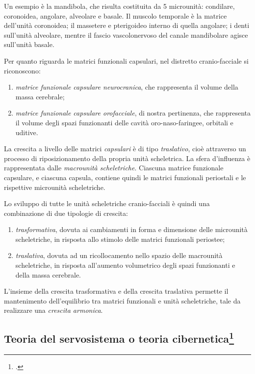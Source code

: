 Un esempio è la mandibola, che risulta costituita da 5 microunità: condilare, coronoidea, angolare, alveolare e basale. Il muscolo temporale è la matrice dell'unità coronoidea; il massetere e pterigoideo interno di quella angolare; i denti sull'unità alveolare, mentre il fascio vascolonervoso del canale mandibolare agisce sull'unità basale.

Per quanto riguarda le matrici funzionali capsulari, nel distretto cranio-facciale si riconoscono:

\begin{enumerate}
\item \textit{matrice funzionale capsulare neurocranica}, che rappresenta il volume della massa cerebrale;
\item \textit{matrice funzionale capsulare orofacciale}, di nostra pertinenza, che rappresenta il volume degli spazi funzionanti delle cavità oro-naso-faringee, orbitali e uditive.
\end{enumerate}

La crescita a livello delle matrici \textit{capsulari} è di tipo \textit{traslativo}, cioè attraverso un processo di riposizionamento della propria unità scheletrica. La sfera d'influenza è rappresentata dalle \textit{macrounità scheletriche}. Ciascuna matrice funzionale capsulare, e ciascuna capsula, contiene quindi le matrici funzionali periostali e le rispettive microunità scheletriche.

Lo sviluppo di tutte le unità scheletriche cranio-facciali è quindi una combinazione di due tipologie di crescita:

\begin{enumerate}
\item \textit{trasformativa}, dovuta ai cambiamenti in forma e dimensione delle microunità scheletriche, in risposta allo stimolo delle matrici funzionali periostee;
\item \textit{traslativa}, dovuta ad un ricollocamento nello spazio delle macrounità scheletriche, in risposta all'aumento volumetrico degli spazi funzionanti e della massa cerebrale.
\end{enumerate}

L'insieme della crescita trasformativa e della crescita traslativa permette il mantenimento dell'equilibrio tra matrici funzionali e unità scheletriche, tale da realizzare una \textit{crescita armonica}.

\subsection*{Teoria del servosistema o teoria cibernetica\protect\footcite{Petrovic1974,Petrovic1981}}

